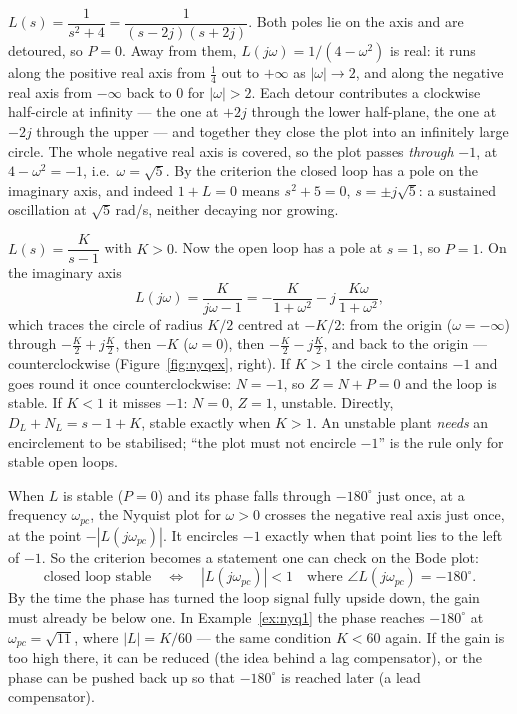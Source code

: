 \documentclass[11pt]{article}
\begin{document}
\begin{example}\label{ex:nyq4}
$L(s)=\dfrac{1}{s^{2}+4}=\dfrac{1}{(s-2j)(s+2j)}$. Both poles lie on the axis and are
detoured, so $P=0$. Away from them, $L(j\omega)=1/(4-\omega^{2})$ is real: it runs
along the positive real axis from $\tfrac14$ out to $+\infty$ as $|\omega|\to2$, and
along the negative real axis from $-\infty$ back to $0$ for $|\omega|>2$. Each detour
contributes a clockwise half-circle at infinity --- the one at $+2j$ through the
lower half-plane, the one at $-2j$ through the upper --- and together they close the
plot into an infinitely large circle. The whole negative real axis is covered, so
the plot passes \emph{through} $-1$, at $4-\omega^{2}=-1$, i.e.\ $\omega=\sqrt5$. By
the criterion the closed loop has a pole on the imaginary axis, and indeed
$1+L=0$ means $s^{2}+5=0$, $s=\pm j\sqrt5$: a sustained oscillation at
$\sqrt5$\,rad/s, neither decaying nor growing.
\end{example}

\begin{example}\label{ex:nyq3}
$L(s)=\dfrac{K}{s-1}$ with $K>0$. Now the open loop has a pole at $s=1$, so $P=1$.
On the imaginary axis
\[
   L(j\omega) = \frac{K}{j\omega-1}
   = -\frac{K}{1+\omega^{2}} - j\,\frac{K\omega}{1+\omega^{2}},
\]
which traces the circle of radius $K/2$ centred at $-K/2$: from the origin
($\omega=-\infty$) through $-\tfrac K2+j\tfrac K2$, then $-K$ ($\omega=0$), then
$-\tfrac K2-j\tfrac K2$, and back to the origin --- counterclockwise
(Figure~\ref{fig:nyqex}, right). If $K>1$ the circle contains $-1$ and goes round it
once counterclockwise: $N=-1$, so $Z=N+P=0$ and the loop is stable. If $K<1$ it
misses $-1$: $N=0$, $Z=1$, unstable. Directly, $D_L+N_L=s-1+K$, stable exactly when
$K>1$. An unstable plant \emph{needs} an encirclement to be stabilised; ``the plot
must not encircle $-1$'' is the rule only for stable open loops.
\end{example}

\begin{remark}\label{rem:bodenyq}
When $L$ is stable ($P=0$) and its phase falls through $-180^\circ$ just once, at a
frequency $\omega_{pc}$, the Nyquist plot for $\omega>0$ crosses the negative real
axis just once, at the point $-|L(j\omega_{pc})|$. It encircles $-1$ exactly when
that point lies to the left of $-1$. So the criterion becomes a statement one can
check on the Bode plot:
\[
   \text{closed loop stable}
   \quad\Longleftrightarrow\quad
   |L(j\omega_{pc})| < 1
   \quad\text{where } \angle L(j\omega_{pc}) = -180^\circ .
\]
By the time the phase has turned the loop signal fully upside down, the gain must
already be below one. In Example~\ref{ex:nyq1} the phase reaches $-180^\circ$ at
$\omega_{pc}=\sqrt{11}$, where $|L|=K/60$ --- the same condition $K<60$ again. If
the gain is too high there, it can be reduced (the idea behind a lag compensator),
or the phase can be pushed back up so that $-180^\circ$ is reached later (a lead
compensator).
\end{remark}
\end{document}
